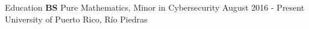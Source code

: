 \documentclass{resume} %
\begin{document}

\begin{rSection}{Education}
    \textbf{BS} \hspace*{10mm} Pure Mathematics, Minor in Cybersecurity
    \hfill{August 2016 - Present} \\
     \hspace*{17mm} University of Puerto Rico, R\'io Piedras
\end{rSection}


\end{document}
